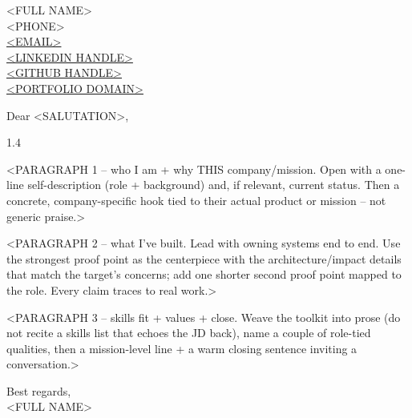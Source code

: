 \documentclass[letterpaper,11pt]{article}
\begin{document}
\begin{singlespace}
<FULL NAME> \\
<PHONE> \\
\href{mailto:<EMAIL>}{<EMAIL>} \\
\href{<LINKEDIN URL>}{<LINKEDIN HANDLE>} \\
\href{<GITHUB URL>}{<GITHUB HANDLE>} \\
\href{<PORTFOLIO URL>}{<PORTFOLIO DOMAIN>}
\end{singlespace}

\vspace{9pt}

Dear <SALUTATION>,

\vspace{6pt}

\begin{spacing}{1.4}
\setlength{\parskip}{5pt}

<PARAGRAPH 1 -- who I am + why THIS company/mission. Open with a one-line self-description
(role + background) and, if relevant, current status. Then a concrete, company-specific hook
tied to their actual product or mission -- not generic praise.>

<PARAGRAPH 2 -- what I've built. Lead with owning systems end to end. Use the strongest proof
point as the centerpiece with the architecture/impact details that match the target's concerns;
add one shorter second proof point mapped to the role. Every claim traces to real work.>

<PARAGRAPH 3 -- skills fit + values + close. Weave the toolkit into prose (do not recite a
skills list that echoes the JD back), name a couple of role-tied qualities, then a mission-level
line + a warm closing sentence inviting a conversation.>

\end{spacing}

\vspace{6pt}

\begin{singlespace}
Best regards, \\
<FULL NAME>
\end{singlespace}
\end{document}
